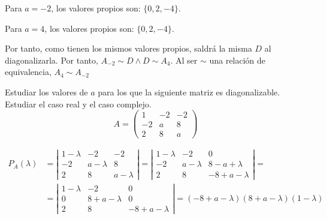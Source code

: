 \begin{ejercicio}
\begin{enumerate}
        Para $a=-2$, los valores propios son: $\{0,2,-4\}$.

        Para $a=4$, los valores propios son: $\{0,2,-4\}$.

        Por tanto, como tienen los mismos valores propios, saldrá la misma $D$ al diagonalizarla. Por tanto, $A_{-2}\sim D \land D\sim A_4$. Al ser $\sim$ una relación de equivalencia, $A_4 \sim A_{-2}$
        
    \end{enumerate}
\end{ejercicio}

\begin{ejercicio}
    Estudiar los valores de $a$ para los que la siguiente matriz es diagonalizable. Estudiar el caso real y el caso complejo.
    \begin{equation*}
        A = \left(\begin{array}{ccc}
            1 & -2 & -2 \\
            -2 & a & 8 \\
            2 & 8 & a
        \end{array}\right)
    \end{equation*}

    \begin{equation*}\begin{split}
        P_A(\lambda) & = \left|\begin{array}{ccc}
            1-\lambda & -2 & -2 \\
            -2 & a-\lambda & 8 \\
            2 & 8 & a-\lambda
        \end{array}\right| = \left|\begin{array}{ccc}
            1-\lambda & -2 & 0 \\
            -2 & a-\lambda & 8-a+\lambda \\
            2 & 8 & -8 + a-\lambda
        \end{array}\right| = \\
        &= \left|\begin{array}{ccc}
            1-\lambda & -2 & 0 \\
            0 & 8+a-\lambda & 0 \\
            2 & 8 & -8 + a-\lambda
        \end{array}\right| = (-8+a-\lambda)(8+a-\lambda)(1-\lambda)
    \end{split}\end{equation*}


\end{ejercicio}
